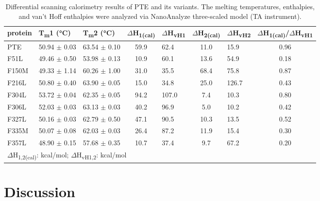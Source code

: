 \begin{refsection}
\begin{table}[htbp]
    \centering
    \begin{tabular}{lllclclc}
    \hline

    protein & T\textsubscript{m}1 (\si{\celsius}) & T\textsubscript{m}2
    (\si{\celsius}) & $\Delta$H\textsubscript{1(cal)} &
    $\Delta$H\textsubscript{vH1} & $\Delta$H\textsubscript{2(cal)} &
    $\Delta$H\textsubscript{vH2} &
    $\Delta$H\textsubscript{1(cal)}/$\Delta$H\textsubscript{vH1} \\
    \hline

    PTE & 50.94 $\pm$ 0.03  & 63.54 $\pm$ 0.10 & 59.9 & 62.4 & 11.0 & 15.9 & 0.96\\
    F51L & 49.46 $\pm$ 0.50 & 53.98 $\pm$ 0.13 & 10.9 & 60.1 & 13.6 & 54.9 & 0.18\\
    F150M & 49.33 $\pm$ 1.14 & 60.26 $\pm$ 1.00 & 31.0 & 35.5 & 68.4 & 75.8 & 0.87\\
    F216L & 50.80 $\pm$ 0.40 & 63.90 $\pm$ 0.05 & 15.0 & 34.8 & 25.0 & 126.7 & 0.43\\
    F304L & 53.72 $\pm$ 0.04 & 62.35 $\pm$ 0.05 & 94.2 & 107.0 & 7.4 & 10.3 & 0.80\\
    F306L & 52.03 $\pm$ 0.03 & 63.13 $\pm$ 0.03 & 40.2 & 96.9 & 5.0 & 10.2 & 0.42\\
    F327L & 50.16 $\pm$ 0.03 & 62.79 $\pm$ 0.50 & 47.1 & 90.5 & 10.3 & 13.5 & 0.52\\
    F335M & 50.07 $\pm$ 0.08 & 62.03 $\pm$ 0.03 & 26.4 & 87.2 & 11.9 & 15.4 & 0.30\\
    F357L & 48.90 $\pm$ 0.15 & 57.68 $\pm$ 0.35 & 10.7 & 37.4 & 9.7 & 67.2 & 0.20\\

    \hline
    \multicolumn{8}{l}{$\Delta$H\textsubscript{1,2(cal)}: kcal/mol;
    $\Delta$H\textsubscript{vH1,2}: kcal/mol}
    \end{tabular}
    \caption[Differential scanning calorimetry results of PTE and its variants.
        The melting temperatures, enthalpies, and van't Hoff enthalpies were
    analyzed via NanoAnalyze three-scaled model (TA instrument).] {Differential
        scanning calorimetry results of PTE and its variants. The melting
        temperatures, enthalpies, and van't Hoff enthalpies were analyzed via
        NanoAnalyze three-scaled model (TA instrument).}
        \label{tab:dsc-chap2-result}
\end{table}

\section{Discussion}


\end{refsection}
